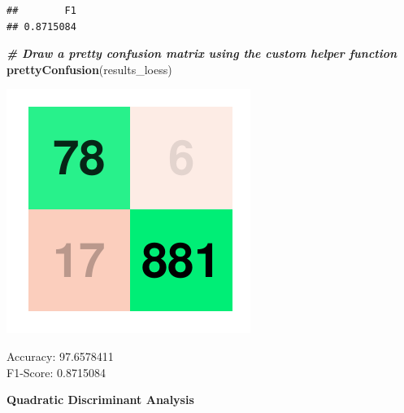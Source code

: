 \documentclass[
]{article}
\newenvironment{Shaded}{\begin{snugshade}}{\end{snugshade}}
\newcommand{\CommentTok}[1]{\textcolor[rgb]{0.00,0.40,1.00}{\textbf{\textit{#1}}}}
\newcommand{\DataTypeTok}[1]{\textcolor[rgb]{0.74,0.68,0.62}{\underline{#1}}}
\newcommand{\KeywordTok}[1]{\textcolor[rgb]{0.26,0.66,0.93}{\textbf{#1}}}
\newcommand{\NormalTok}[1]{\textcolor[rgb]{0.74,0.68,0.62}{#1}}
\newcommand{\OperatorTok}[1]{\textcolor[rgb]{0.74,0.68,0.62}{#1}}
\newcommand{\StringTok}[1]{\textcolor[rgb]{0.02,0.61,0.04}{#1}}
\begin{document}
\begin{verbatim}
##        F1 
## 0.8715084
\end{verbatim}

\begin{Shaded}
\begin{Highlighting}[]
\CommentTok{# Draw a pretty confusion matrix using the custom helper function}
\KeywordTok{prettyConfusion}\NormalTok{(results_loess)}
\end{Highlighting}
\end{Shaded}

\includegraphics{Bank_Loan_Classification_files/figure-latex/unnamed-chunk-31-1.pdf}

Accuracy: 97.6578411\\
F1-Score: 0.8715084

\textbf{Quadratic Discriminant Analysis}

\begin{Shaded}
\end{Shaded}
\end{document}
